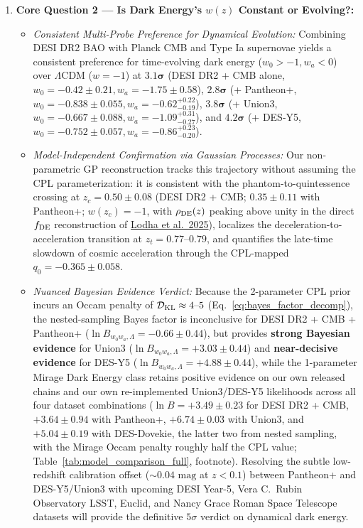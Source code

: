 \documentclass[11pt,letterpaper]{article}
\begin{document}
\begin{enumerate}
\begin{itemize}
    \end{itemize}
    \item \textbf{Core Question 2 --- Is Dark Energy's $w(z)$ Constant or Evolving?:}
    \begin{itemize}
        \setlength{\itemsep}{2pt}
        \item \emph{Consistent Multi-Probe Preference for Dynamical Evolution:} Combining DESI DR2 BAO with Planck CMB and Type Ia supernovae yields a consistent preference for time-evolving dark energy ($w_0 > -1, w_a < 0$) over $\Lambda$CDM ($w=-1$) at $\mathbf{3.1}\boldsymbol{\sigma}$ (DESI DR2 + CMB alone, $w_0 = -0.42 \pm 0.21, w_a = -1.75 \pm 0.58$), $\mathbf{2.8}\boldsymbol{\sigma}$ (+ Pantheon+, $w_0 = -0.838 \pm 0.055, w_a = -0.62^{+0.22}_{-0.19}$), $\mathbf{3.8}\boldsymbol{\sigma}$ (+ Union3, $w_0 = -0.667 \pm 0.088, w_a = -1.09^{+0.31}_{-0.27}$), and $\mathbf{4.2}\boldsymbol{\sigma}$ (+ DES-Y5, $w_0 = -0.752 \pm 0.057, w_a = -0.86^{+0.23}_{-0.20}$).
        \item \emph{Model-Independent Confirmation via Gaussian Processes:} Our non-parametric GP reconstruction tracks this trajectory without assuming the CPL parameterization: it is consistent with the phantom-to-quintessence crossing at $z_c = 0.50 \pm 0.08$ (DESI DR2 + CMB; $0.35 \pm 0.11$ with Pantheon+; $w(z_c) = -1$, with $\rho_{\rm DE}(z)$ peaking above unity in the direct $f_{\rm DE}$ reconstruction of \href{https://arxiv.org/abs/2503.14743}{Lodha et al.\ 2025}), localizes the deceleration-to-acceleration transition at $z_t = 0.77\text{--}0.79$, and quantifies the late-time slowdown of cosmic acceleration through the CPL-mapped $q_0 = -0.365 \pm 0.058$.
        \item \emph{Nuanced Bayesian Evidence Verdict:} Because the 2-parameter CPL prior incurs an Occam penalty of $\mathcal{D}_{\rm KL} \approx 4\text{--}5$ (Eq.~\ref{eq:bayes_factor_decomp}), the nested-sampling Bayes factor is inconclusive for DESI DR2 + CMB + Pantheon+ ($\ln B_{w_0 w_a, \Lambda} = -0.66 \pm 0.44$), but provides \textbf{strong Bayesian evidence} for Union3 ($\ln B_{w_0 w_a, \Lambda} = +3.03 \pm 0.44$) and \textbf{near-decisive evidence} for DES-Y5 ($\ln B_{w_0 w_a, \Lambda} = +4.88 \pm 0.44$), while the 1-parameter Mirage Dark Energy class retains positive evidence on our own released chains and our own re-implemented Union3/DES-Y5 likelihoods across all four dataset combinations ($\ln B = +3.49 \pm 0.23$ for DESI DR2 + CMB, $+3.64 \pm 0.94$ with Pantheon+, $+6.74 \pm 0.03$ with Union3, and $+5.04 \pm 0.19$ with DES-Dovekie, the latter two from nested sampling, with the Mirage Occam penalty roughly half the CPL value; Table~\ref{tab:model_comparison_full}, footnote). Resolving the subtle low-redshift calibration offset ($\sim 0.04\text{ mag}$ at $z < 0.1$) between Pantheon+ and DES-Y5/Union3 with upcoming DESI Year-5, Vera C.\ Rubin Observatory LSST, Euclid, and Nancy Grace Roman Space Telescope datasets will provide the definitive $5\sigma$ verdict on dynamical dark energy.
    \end{itemize}
\end{enumerate}
\end{document}
